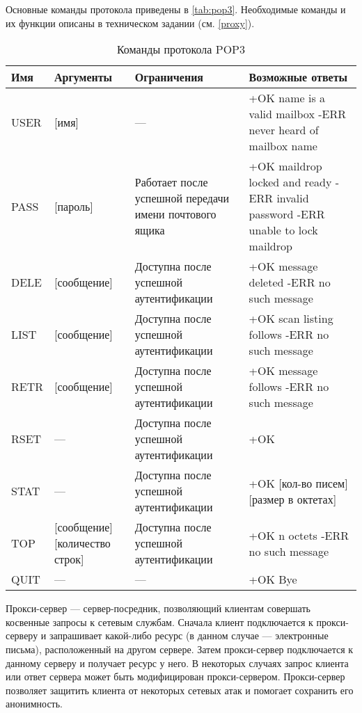Основные команды протокола приведены в \vref{tab:pop3}. Необходимые команды и их функции описаны в техническом задании (см. \vref{proxy}).

\begin{table}[H]
	\centering
	\begin{tabular}{|M{1.5cm}|M{3cm}|M{4.5cm}|M{7.5cm}|}
		\hline Имя & Аргументы & Ограничения & Возможные ответы \\
		\hline USER & [имя] & --- & +OK name is a valid mailbox \newline -ERR never heard of mailbox name \\
		\hline PASS & [пароль] & Работает после успешной передачи имени почтового ящика & +OK maildrop locked and ready \newline -ERR invalid password \newline -ERR unable to lock maildrop \\
		\hline DELE & [сообщение] & Доступна после успешной аутентификации & +OK message deleted \newline -ERR no such message \\
		\hline LIST & [сообщение] & Доступна после успешной аутентификации & +OK scan listing follows \newline -ERR no such message \\
		\hline RETR & [сообщение] & Доступна после успешной аутентификации & +OK message follows \newline -ERR no such message \\
		\hline RSET & --- & Доступна после успешной аутентификации & +OK \\
		\hline STAT & --- & Доступна после успешной аутентификации & +OK [кол-во писем] [размер в октетах] \\
		\hline TOP & [сообщение] [количество строк] & Доступна после успешной аутентификации & +OK n octets \newline -ERR no such message \\
		\hline QUIT & --- & --- & +OK Bye \\ \hline
	\end{tabular}
	\caption{Команды протокола POP3}
	\label{tab:pop3}
\end{table}

Прокси-сервер --- сервер-посредник, позволяющий клиентам совершать косвенные запросы к сетевым службам. Сначала клиент подключается к прокси-серверу и запрашивает какой-либо ресурс (в данном случае --- электронные письма), расположенный на другом сервере. Затем прокси-сервер подключается к данному серверу и получает ресурс у него. В некоторых случаях запрос клиента или ответ сервера может быть модифицирован прокси-сервером. Прокси-сервер позволяет защитить клиента от некоторых сетевых атак и помогает сохранить его анонимность.

